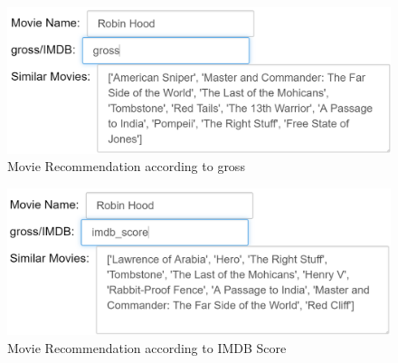 \documentclass{article}%
\begin{document}
\begin{figure}
\centering
\includegraphics[width=1.0\columnwidth]{Fig/suggestiongross.PNG}
\caption{Movie Recommendation according to gross}
\label{fig:suggestiongross}
\end{figure}

\begin{figure}
\centering
\includegraphics[width=1.0\columnwidth]{Fig/suggestionimdbscore.PNG}
\caption{Movie Recommendation according to IMDB Score}
\label{fig:suggestionimdbscore}
\end{figure}
\end{document}
